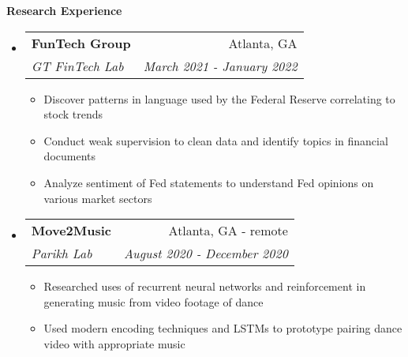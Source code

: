 \documentclass[letterpaper,10pt]{article}
\makeatletter
\newcommand{\resitem}[1]{\item #1 \vspace{-3.5pt}}
\newcommand{\resheading}[1]{{\large \colorbox{mygrey}{\begin{minipage}{\textwidth}{\textbf{#1 \vphantom{p\^{E}}}}\end{minipage}}}}
\newcommand{\ressubheading}[4]{
\begin{tabular*}{7.0in}{l@{\extracolsep{\fill}}r}
		\textbf{#1} & #2 \\
		\textit{#3} & \textit{#4} \\
\end{tabular*}\vspace{-6pt}}
\makeatother
\begin{document}

\resheading{Research Experience}
\begin{itemize}
\item
    \ressubheading{FunTech Group}{Atlanta, GA}{GT FinTech Lab}{March 2021 - January 2022}
    \begin{itemize}
        \resitem{Discover patterns in language used by the Federal Reserve correlating to stock trends}
        \resitem{Conduct weak supervision to clean data and identify topics in financial documents}
        \resitem{Analyze sentiment of Fed statements to understand Fed opinions on various market sectors}
    \end{itemize}
\item
    \ressubheading{Move2Music}{Atlanta, GA - remote}{Parikh Lab}{August 2020 - December 2020}
    \begin{itemize}
        \resitem{Researched uses of recurrent neural networks and reinforcement in generating music from video footage of dance}
        \resitem{Used modern encoding techniques and LSTMs to prototype pairing dance video with appropriate music}
    \end{itemize}
\end{itemize}
\end{document}
